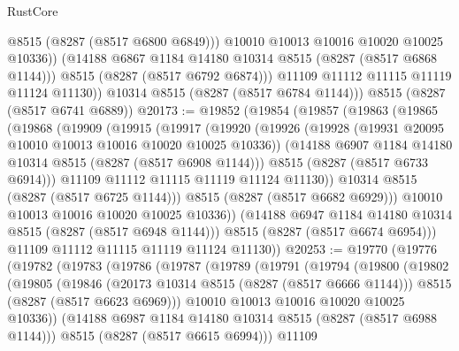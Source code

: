\begin{lexlean}{RustCore}
\begin{coremodule}
                  @8515
                  (@8287 (@8517 @6800 @6849)))
                @10010
                @10013
                @10016
                @10020
                @10025
                @10336))
            (@14188 @6867 @1184 @14180 @10314 @8515 (@8287 (@8517 @6868 @1144)))
            @8515
            (@8287 (@8517 @6792 @6874)))
          @11109
          @11112
          @11115
          @11119
          @11124
          @11130))
      @10314
      @8515
      (@8287 (@8517 @6784 @1144)))
    @8515
    (@8287 (@8517 @6741 @6889))
@20173 := @19852
    (@19854
      (@19857
        (@19863
          (@19865
            (@19868
              (@19909
                (@19915
                  (@19917
                    (@19920
                      (@19926
                        (@19928 (@19931 @20095 @10010 @10013 @10016 @10020 @10025 @10336))
                        (@14188 @6907 @1184 @14180 @10314 @8515 (@8287 (@8517 @6908 @1144)))
                        @8515
                        (@8287 (@8517 @6733 @6914)))
                      @11109
                      @11112
                      @11115
                      @11119
                      @11124
                      @11130))
                  @10314
                  @8515
                  (@8287 (@8517 @6725 @1144)))
                @8515
                (@8287 (@8517 @6682 @6929)))
              @10010
              @10013
              @10016
              @10020
              @10025
              @10336))
          (@14188 @6947 @1184 @14180 @10314 @8515 (@8287 (@8517 @6948 @1144)))
          @8515
          (@8287 (@8517 @6674 @6954)))
        @11109
        @11112
        @11115
        @11119
        @11124
        @11130))
@20253 := @19770
    (@19776
      (@19782
        (@19783
          (@19786
            (@19787
              (@19789
                (@19791
                  (@19794
                    (@19800
                      (@19802
                        (@19805
                          (@19846
                            (@20173 @10314 @8515 (@8287 (@8517 @6666 @1144)))
                            @8515
                            (@8287 (@8517 @6623 @6969)))
                          @10010
                          @10013
                          @10016
                          @10020
                          @10025
                          @10336))
                      (@14188 @6987 @1184 @14180 @10314 @8515 (@8287 (@8517 @6988 @1144)))
                      @8515
                      (@8287 (@8517 @6615 @6994)))
                    @11109

\end{coremodule}
\end{lexlean}
